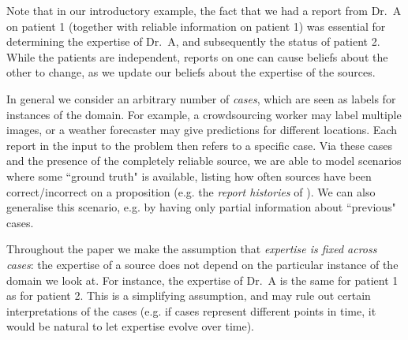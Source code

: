 
Note that in our introductory example, the fact that we had a report from Dr.\ A
on patient 1 (together with reliable information on patient 1) was essential
for determining the expertise of Dr.\ A, and subsequently the status of patient
2. While the patients are independent, reports on one can cause beliefs about
the other to change, as we update our beliefs about the expertise of the
sources.

In general we consider an arbitrary number of \emph{cases}, which are
seen as labels for instances of the domain. For example, a crowdsourcing worker
may label multiple images, or a weather forecaster may give predictions for
different locations. Each report in the input to the
problem then refers to a specific case. Via these cases and the presence of the
completely reliable source, we are able to model scenarios where some ``ground
truth" is available, listing how often sources have been correct/incorrect on a
proposition (e.g. the \emph{report histories} of
\textcite{hunter_building_21}). We can also generalise this scenario, e.g. by
having only partial information about ``previous" cases.

Throughout the paper we make the assumption that \emph{expertise is fixed
across cases}: the expertise of a source does not depend on the particular
instance of the domain we look at. For instance, the expertise of Dr.\ A is the
same for patient 1 as for patient 2. This is a simplifying assumption, and may
rule out certain interpretations of the cases (e.g. if cases represent
different points in time, it would be natural to let expertise evolve over
time).


